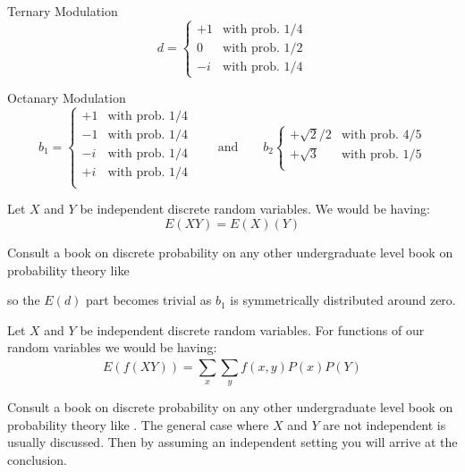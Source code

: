   Ternary Modulation
  \begin{equation*}
	d =
		\begin{cases}
			+1 & \text{with prob.  $1/4$}\\
			0 & \text{with prob.  $1/2$}\\
			-i & \text{with prob.  $1/4$}
		\end{cases}  
  \end{equation*}
  
  
  
  
  
  Octanary Modulation
  \begin{equation*}
	b_1 =
		\begin{cases}
			+1 & \text{with prob.  $1/4$}\\
			-1 & \text{with prob.  $1/4$}\\
			-i & \text{with prob.  $1/4$}\\
			+i & \text{with prob.  $1/4$}\\
  
		\end{cases}  
		\qquad \text{and} \qquad 
	b_2 
		\begin{cases}  
		  +\sqrt{2}/2 & \text{with prob.  $4/5$}\\
		  +\sqrt{3} & \text{with prob.  $1/5$}\\
	  \end{cases}   
  \end{equation*}



\begin{Thm}
	Let $X$ and $Y$ be independent discrete random variables. We would be having:
	\begin{equation*}
		E(XY) = E(X)(Y)
	\end{equation*}
\end{Thm}
\begin{Proof}
Consult a book on discrete probability on any other undergraduate level book on probability theory like \cite{Chung2003}
\end{Proof}
		
  so the $E(d)$ part becomes trivial as $b_1$ is symmetrically distributed around zero. 

  \begin{Thm}
	Let $X$ and $Y$ be independent discrete random variables. For functions of our random variables we would be having:
	\begin{equation*}
		E(f(XY)) = \sum_{x}^{}\sum_{y}^{}f(x,y)P(x)P(Y)
	\end{equation*}
\end{Thm}
\begin{Proof}
	Consult a book on discrete probability on any other undergraduate level book on probability theory like \cite{DasGupta2011}.
	The general case where $X$ and $Y$ are not independent is usually discussed. Then by assuming an independent setting 
	you will arrive at the conclusion.
	\end{Proof}



